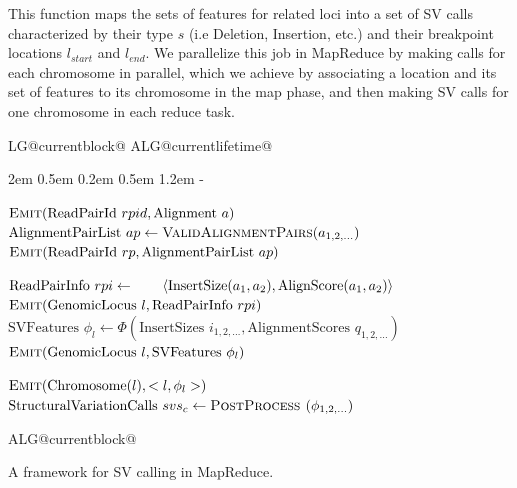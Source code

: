 \documentclass{bioinfo}
\makeatletter
\newlength{\continueindent}
\renewenvironment{algorithmic}[1][0]%
   {%
   \edef\ALG@numberfreq{#1}%
   \def\@currentlabel{\theALG@line}%
   \setcounter{ALG@line}{0}%
   \setcounter{ALG@rem}{0}%
   \let\\\algbreak%
   \expandafter\edef\csname ALG@currentblock@\theALG@nested\endcsname{0}%
   \expandafter\let\csname ALG@currentlifetime@\theALG@nested\endcsname\relax%
   \begin{list}%
      {\ALG@step}%
      {%
      \rightmargin\z@%
      \itemsep\z@ \itemindent\z@ \listparindent2em%
      \partopsep\z@ \parskip\z@ \parsep\z@%
      \labelsep 0.5em \topsep 0.2em%
      \ifthenelse{\equal{#1}{0}}%
         {\labelwidth 0.5em}%
         {\labelwidth 1.2em}%
       \leftmargin\labelwidth \addtolength{\leftmargin}{\labelsep}
      \ALG@tlm\z@%
      }%
      \parshape 2 \leftmargin \linewidth \continueindent \dimexpr\linewidth-\continueindent\relax
   \setcounter{ALG@nested}{0}%
   \ALG@beginalgorithmic%
   }%
   {%
   \ALG@closeloops%
   \expandafter\ifnum\csname ALG@currentblock@\theALG@nested\endcsname=0\relax%
   \else%
      \PackageError{algorithmicx}{Some blocks are not closed!!!}{}%
   \fi%
   \ALG@endalgorithmic%
   \end{list}%
   }%
\makeatother
\begin{document}
\begin{methods}
This function maps the sets of features for related loci into a set of SV calls characterized by their type $s$ (i.e Deletion, Insertion, etc.) and their breakpoint locations $l_{start}$ and $l_{end}$. We parallelize this job in MapReduce by making calls for each chromosome in parallel, which we achieve by associating a location and its set of features to its chromosome in the map phase, and then making SV calls for one chromosome in each reduce task.

\begin{algorithm}[t]
\algrenewcommand{}
 \begin{algorithmic}[1]\raggedright
\footnotesize{
 \State $\textsc{Emit}(\textrm{ReadPairId }rpid, \textrm{Alignment }a)$
 \EndFor
 \EndFunction
 \State $\textrm{AlignmentPairList }ap \gets \textsc{ValidAlignmentPairs}(a_{1,2,\ldots})$
 \State $\textsc{Emit}(\textrm{ReadPairId }rp, \textrm{AlignmentPairList } ap)$
 \EndFunction
 \EndProcedure

 \State $ \textrm{ReadPairInfo }rpi \gets \break\hspace*{2em} \langle\textrm{InsertSize}(a_1,a_2), \textrm{AlignScore}(a_1,a_2)\rangle$
 \State $\textsc{Emit}(\textrm{GenomicLocus }l, \textrm{ReadPairInfo }rpi)$
 \EndFor
 \EndFor
 \EndFunction
 \State $\textrm{SVFeatures } \phi_l \gets \Phi(\textrm{InsertSizes }i_{1,2,\ldots}, \textrm{AlignmentScores }q_{1,2,\ldots})$
 \State $\textsc{Emit}(\textrm{GenomicLocus }l, \textrm{SVFeatures } \phi_l)$
 \EndFunction
 \EndProcedure

 \State $\textsc{Emit}(\textrm{Chromosome}(l), <l,\phi_l>)$
 \EndFunction
 \State $\textrm{StructuralVariationCalls } svs_c \gets \textsc{PostProcess }(\phi_{1,2,\ldots})$
 \EndFunction
 \EndProcedure
}
 \end{algorithmic}
\caption{A framework for SV calling in MapReduce.}
\label{cb_algo}
\end{algorithm}


\end{methods}
\end{document}
